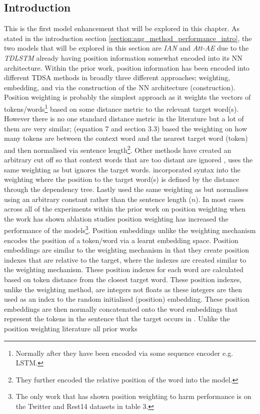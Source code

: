 \subsection{Introduction}
This is the first model enhancement that will be explored in this chapter. As stated in the introduction section \ref{section:aug_method_performance_intro}, the two models that will be explored in this section are \textit{IAN} and \textit{Att-AE} due to the \textit{TDLSTM} already having position information somewhat encoded into its NN architecture. Within the prior work, position information has been encoded into different TDSA methods in broadly three different approaches; weighting, embedding, and via the construction of the NN architecture (construction). Position weighting is probably the simplest approach as it weights the vectors of tokens/words\footnote{Normally after they have been encoded via some sequence encoder e.g. LSTM.} based on some distance metric to the relevant target word(s). However there is no one standard distance metric in the literature but a lot of them are very similar; \citet{chen-etal-2017-recurrent} (equation 7 and section 3.3) based the weighting on how many tokens are between the context word and the nearest target word (token) and then normalised via sentence length\footnote{They further encoded the relative position of the word into the model.}. Other methods have created an arbitrary cut off so that context words that are too distant are ignored \citep{he-etal-2018-exploiting, zhao2019modeling}, \citet{zhang-etal-2019-aspect} uses the same weighting as \citet{chen-etal-2017-recurrent} but ignores the target words. \citet{he-etal-2018-exploiting} incorporated syntax into the weighting where the position to the target word(s) is defined by the distance through the dependency tree. Lastly \citet{li-etal-2018-transformation} used the same weighting as \citet{chen-etal-2017-recurrent} but normalises using an arbitrary constant rather than the sentence length ($n$).  In most cases across all of the experiments within the prior work on position weighting when the work has shown ablation studies position weighting has increased the performance of the models\footnote{The only work that has shown position weighting to harm performance is \citet{zhang-etal-2019-aspect} on the Twitter and Rest14 datasets in table 3.}. Position embeddings unlike the weighting mechanism encodes the position of a token/word via a learnt embedding space. Position embeddings are similar to the weighting mechanism in that they create position indexes that are relative to the target, where the indexes are created similar to the weighting mechanism. These position indexes for each word are calculated based on token distance from the closest target word. These position indexes, unlike the weighting method, are integers not floats as these integers are then used as an index to the random initialised (position) embedding. These position embeddings are then normally concatenated onto the word embeddings that represent the tokens in the sentence that the target occurs in \citep{gu-etal-2018-position, li-etal-2018-hierarchical, chen-qian-2019-transfer, sun-etal-2019-aspect, kumar2020aspect}. Unlike the position weighting literature all prior works 